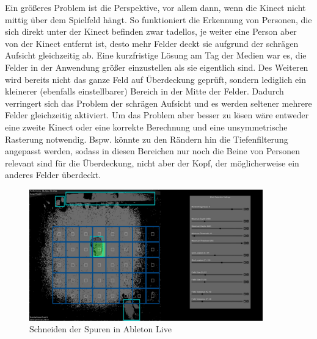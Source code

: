Ein größeres Problem ist die Perspektive, vor allem dann, wenn die Kinect nicht mittig über dem Spielfeld hängt. So funktioniert die Erkennung von Personen, die sich direkt unter der Kinect befinden zwar tadellos, je weiter eine Person aber von der Kinect entfernt ist, desto mehr Felder deckt sie aufgrund der schrägen Aufsicht gleichzeitig ab. Eine kurzfristige Lösung am Tag der Medien war es, die Felder in der Anwendung größer einzustellen als sie eigentlich sind. Des Weiteren wird bereits nicht das ganze Feld auf Überdeckung geprüft, sondern lediglich ein kleinerer (ebenfalls einstellbarer) Bereich in der Mitte der Felder. Dadurch verringert sich das Problem der schrägen Aufsicht und es werden seltener mehrere Felder gleichzeitig aktiviert. Um das Problem aber besser zu lösen wäre entweder eine zweite Kinect oder eine korrekte Berechnung und eine unsymmetrische Rasterung notwendig. Bspw. könnte zu den Rändern hin die Tiefenfilterung angepasst werden, sodass in diesen Bereichen nur noch die Beine von Personen relevant sind für die Überdeckung, nicht aber der Kopf, der möglicherweise ein anderes Felder überdeckt.


\newpage

\begin{figure}[htbp] 
  \centering
     \includegraphics[width=0.9\textwidth]{images/Blob}
  \caption{Schneiden der Spuren in Ableton Live}
  \label{fig:audio1}
\end{figure}